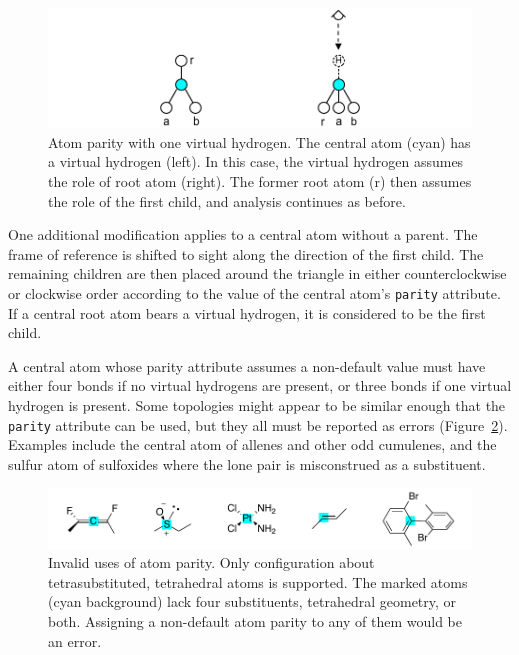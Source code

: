 \documentclass{article}
\def\ttt{\texttt}
\begin{document}
\begin{figure}
    \centering
    \includegraphics[width=\columnwidth]{atom-parity-suppressed-hydrogen.pdf}
    \caption{Atom parity with one virtual hydrogen. The central atom (cyan) has a virtual hydrogen (left). In this case, the virtual hydrogen assumes the role of root atom (right). The former root atom (r) then assumes the role of the first child,  and analysis continues as before.}
    \label{fig:atom-parity-suppressed-hydrogen}
\end{figure}

One additional modification applies to a central atom without a parent. The frame of reference is shifted to sight along the direction of the first child. The remaining children are then placed around the triangle in either counterclockwise or clockwise order according to the value of the central atom's \ttt{parity} attribute. If a central root atom bears a virtual hydrogen, it is considered to be the first child.

A central atom whose parity attribute assumes a non-default value must have either four bonds if no virtual hydrogens are present, or three bonds if one virtual hydrogen is present. Some topologies might appear to be similar enough that the \ttt{parity} attribute can be used, but they all must be reported as errors (Figure~\ref{fig:invalid-atom-parity}). Examples include the central atom of allenes and other odd cumulenes, and the sulfur atom of sulfoxides where the lone pair is misconstrued as a substituent.

\begin{figure}
    \centering
    \includegraphics[width=\columnwidth]{invalid-atom-parity.pdf}
    \caption{Invalid uses of atom parity. Only configuration about tetrasubstituted, tetrahedral atoms is supported. The marked atoms (cyan background) lack four substituents, tetrahedral geometry, or both. Assigning a non-default atom parity to any of them would be an error.}
    \label{fig:invalid-atom-parity}
\end{figure}
\end{document}
